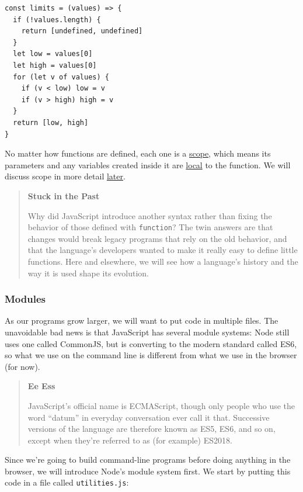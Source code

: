 \begin{verbatim}
const limits = (values) => {
  if (!values.length) {
    return [undefined, undefined]
  }
  let low = values[0]
  let high = values[0]
  for (let v of values) {
    if (v < low) low = v
    if (v > high) high = v
  }
  return [low, high]
}
\end{verbatim}

No matter how functions are defined, each one is a
\protect\hyperlink{g:scope}{scope}, which means its parameters and any
variables created inside it are
\protect\hyperlink{g:local-variable}{local} to the function. We will
discuss scope in more detail \protect\hyperlink{s:callbacks}{later}.

\begin{quote}
\textbf{Stuck in the Past}

Why did JavaScript introduce another syntax rather than fixing the
behavior of those defined with \texttt{function}? The twin answers are
that changes would break legacy programs that rely on the old behavior,
and that the language's developers wanted to make it really easy to
define little functions. Here and elsewhere, we will see how a
language's history and the way it is used shape its evolution.
\end{quote}

\subsubsection{Modules}\label{s:basics-modules}

As our programs grow larger, we will want to put code in multiple files.
The unavoidable bad news is that JavaScript has several module systems:
Node still uses one called CommonJS, but is converting to the modern
standard called ES6, so what we use on the command line is different
from what we use in the browser (for now).

\begin{quote}
\textbf{Ee Ess}

JavaScript's official name is ECMAScript, though only people who use the
word ``datum'' in everyday conversation ever call it that. Successive
versions of the language are therefore known as ES5, ES6, and so on,
except when they're referred to as (for example) ES2018.
\end{quote}

Since we're going to build command-line programs before doing anything
in the browser, we will introduce Node's module system first. We start
by putting this code in a file called \texttt{utilities.js}:

